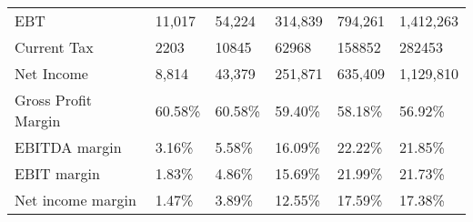 \begin{tabular}{llllll}
 EBT                        & 11,017  & 54,224    & 314,839   & 794,261   & 1,412,263 \\
 Current Tax                & 2203    & 10845     & 62968     & 158852    & 282453    \\
 Net Income                 & 8,814   & 43,379    & 251,871   & 635,409   & 1,129,810 \\
 Gross Profit Margin        & 60.58\%  & 60.58\%    & 59.40\%    & 58.18\%    & 56.92\%    \\
 EBITDA margin              & 3.16\%   & 5.58\%     & 16.09\%    & 22.22\%    & 21.85\%    \\
 EBIT margin                & 1.83\%   & 4.86\%     & 15.69\%    & 21.99\%    & 21.73\%    \\
 Net income margin          & 1.47\%   & 3.89\%     & 12.55\%    & 17.59\%    & 17.38\%    \\
\hline
\end{tabular}